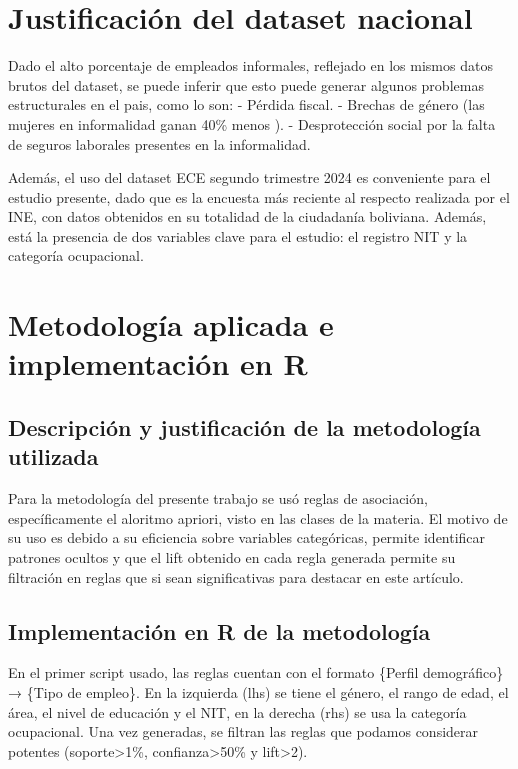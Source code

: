 \documentclass[Royal,times,sageh]{sagej}
\begin{document}
\section{Justificación del dataset
nacional}\label{justificaciuxf3n-del-dataset-nacional}

Dado el alto porcentaje de empleados informales, reflejado en los mismos
datos brutos del dataset, se puede inferir que esto puede generar
algunos problemas estructurales en el pais, como lo son: - Pérdida
fiscal. - Brechas de género (las mujeres en informalidad ganan 40\%
menos \citep{urquidi2021brecha}). - Desprotección social por la falta de
seguros laborales presentes en la informalidad.

Además, el uso del dataset ECE segundo trimestre 2024 es conveniente
para el estudio presente, dado que es la encuesta más reciente al
respecto realizada por el INE, con datos obtenidos en su totalidad de la
ciudadanía boliviana. Además, está la presencia de dos variables clave
para el estudio: el registro NIT y la categoría ocupacional.

\section{Metodología aplicada e implementación en
R}\label{metodologuxeda-aplicada-e-implementaciuxf3n-en-r}

\subsection{Descripción y justificación de la metodología
utilizada}\label{descripciuxf3n-y-justificaciuxf3n-de-la-metodologuxeda-utilizada}

Para la metodología del presente trabajo se usó reglas de asociación,
específicamente el aloritmo apriori, visto en las clases de la materia.
El motivo de su uso es debido a su eficiencia sobre variables
categóricas, permite identificar patrones ocultos y que el lift obtenido
en cada regla generada permite su filtración en reglas que si sean
significativas para destacar en este artículo.

\subsection{Implementación en R de la
metodología}\label{implementaciuxf3n-en-r-de-la-metodologuxeda}

En el primer script usado, las reglas cuentan con el formato \{Perfil
demográfico\} → \{Tipo de empleo\}. En la izquierda (lhs) se tiene el
género, el rango de edad, el área, el nivel de educación y el NIT, en la
derecha (rhs) se usa la categoría ocupacional. Una vez generadas, se
filtran las reglas que podamos considerar potentes
(soporte\textgreater1\%, confianza\textgreater50\% y lift\textgreater2).
\end{document}
